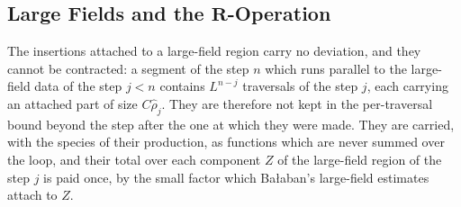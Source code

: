 \documentclass[11pt]{preprint}
\numberwithin{equation}{section}
\theoremstyle{definition}
\theoremstyle{remark}
\theoremstyle{plain}
\begin{document}
\subsection{Large Fields and the \texorpdfstring{$\mathbf R$}{R}-Operation}\label{sec:large-field-step}

The insertions attached to a large-field region carry no deviation, and they cannot be contracted: a segment of the step $n$ which runs parallel to the large-field data of the step $j < n$ contains $L^{n-j}$ traversals of the step $j$, each carrying an attached part of size $C\hat\rho_j$. They are therefore not kept in the per-traversal bound beyond the step after the one at which they were made. They are carried, with the species of their production, as functions which are never summed over the loop, and their total over each component $Z$ of the large-field region of the step $j$ is paid once, by the small factor which Ba{\l}aban's large-field estimates attach to $Z$.
\end{document}

